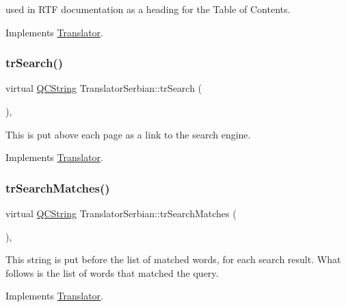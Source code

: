 used in R\+TF documentation as a heading for the Table of Contents. 

Implements \mbox{\hyperlink{class_translator}{Translator}}.

\mbox{\label{class_translator_serbian_a31bf3f76f2157bd4fa730e8529c98178}} 
\subsubsection{\texorpdfstring{trSearch()}{trSearch()}}
{\footnotesize\ttfamily virtual \mbox{\hyperlink{class_q_c_string}{Q\+C\+String}} Translator\+Serbian\+::tr\+Search (\begin{DoxyParamCaption}{ }\end{DoxyParamCaption})\hspace{0.3cm}{\ttfamily [inline]}, {\ttfamily [virtual]}}

This is put above each page as a link to the search engine. 

Implements \mbox{\hyperlink{class_translator}{Translator}}.

\mbox{\label{class_translator_serbian_a260257e96ae59e096bc78a4e8e40b771}} 
\subsubsection{\texorpdfstring{trSearchMatches()}{trSearchMatches()}}
{\footnotesize\ttfamily virtual \mbox{\hyperlink{class_q_c_string}{Q\+C\+String}} Translator\+Serbian\+::tr\+Search\+Matches (\begin{DoxyParamCaption}{ }\end{DoxyParamCaption})\hspace{0.3cm}{\ttfamily [inline]}, {\ttfamily [virtual]}}

This string is put before the list of matched words, for each search result. What follows is the list of words that matched the query. 

Implements \mbox{\hyperlink{class_translator}{Translator}}.

\mbox{\label{class_translator_serbian_afab8b6d7f67b064949cdfefa30a00126}} 
